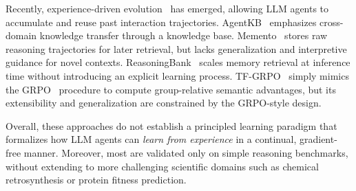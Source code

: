 Recently, experience-driven evolution~\cite{tang2025agent,zhou2025memento,ouyang2025reasoningbank,cai2025training} has emerged, allowing LLM agents to accumulate and reuse past interaction trajectories.
AgentKB~\cite{tang2025agent} emphasizes cross-domain knowledge transfer through a knowledge base. 
Memento~\cite{zhou2025memento} stores raw reasoning trajectories for later retrieval, but lacks generalization and interpretive guidance for novel contexts.
ReasoningBank~\cite{ouyang2025reasoningbank} scales memory retrieval at inference time without introducing an explicit learning process.
TF-GRPO~\cite{cai2025training} simply mimics the GRPO~\cite{shao2024deepseekmath} procedure to compute group-relative semantic advantages, but its extensibility and generalization are constrained by the GRPO-style design.

Overall, these approaches do not establish a principled learning paradigm that formalizes how LLM agents can \emph{learn from experience} in a continual, gradient-free manner. 
Moreover, most are validated only on simple reasoning benchmarks, without extending to more challenging scientific domains such as chemical retrosynthesis or protein fitness prediction.
